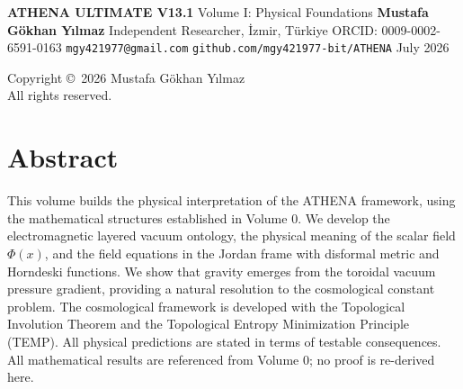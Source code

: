 \documentclass[12pt,oneside]{book}
\begin{document}
\frontmatter

\begin{titlepage}
\centering
\vspace*{1cm}
{\Huge\bfseries ATHENA ULTIMATE V13.1}
\vspace{0.5cm}
{\Large Volume I: Physical Foundations}
\vspace{2cm}
{\Large \textbf{Mustafa Gökhan Yılmaz}}
\vspace{0.3cm}
{\large Independent Researcher, İzmir, Türkiye}
\vspace{0.2cm}
{\large ORCID: 0009-0002-6591-0163}
\vspace{0.2cm}
{\large \texttt{mgy421977@gmail.com}}
\vspace{0.2cm}
{\large \texttt{github.com/mgy421977-bit/ATHENA}}
\vspace{2cm}
{\large July 2026}
\vfill
\end{titlepage}

\newpage
\thispagestyle{empty}
\vspace*{\fill}
\begin{center}
Copyright \copyright\ 2026 Mustafa Gökhan Yılmaz\\
All rights reserved.
\end{center}
\vspace*{\fill}

\chapter*{Abstract}

This volume builds the physical interpretation of the ATHENA framework, using the mathematical structures established in Volume 0. We develop the electromagnetic layered vacuum ontology, the physical meaning of the scalar field $\Phi(x)$, and the field equations in the Jordan frame with disformal metric and Horndeski functions. We show that gravity emerges from the toroidal vacuum pressure gradient, providing a natural resolution to the cosmological constant problem. The cosmological framework is developed with the Topological Involution Theorem and the Topological Entropy Minimization Principle (TEMP). All physical predictions are stated in terms of testable consequences. All mathematical results are referenced from Volume 0; no proof is re-derived here.

\tableofcontents
\end{document}
